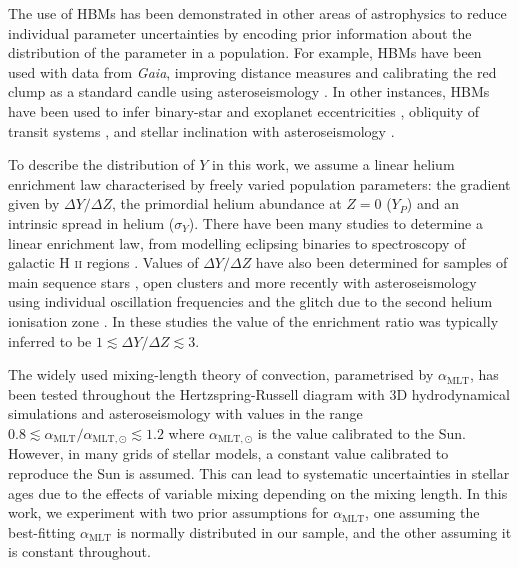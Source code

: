 \documentclass[a4paper,fleqn,usenatbib]{mnras}
\newcommand{\mlt}{\ensuremath{{\alpha_\mathrm{MLT}}}}
\begin{document}
The use of HBMs has been demonstrated in other areas of astrophysics to reduce individual parameter uncertainties by encoding prior information about the distribution of the parameter in a population. For example, HBMs have been used with data from \emph{Gaia}, improving distance measures \citep{Leistedt.Hogg2017, Anderson.Hogg.ea2018} and calibrating the red clump as a standard candle \citep{Hawkins.Leistedt.ea2017, Chan.Bovy2020} using asteroseismology \citep{Hall.Davies.ea2019}. In other instances, HBMs have been used to infer binary-star and exoplanet eccentricities \citep{Hogg.Myers.ea2010}, obliquity of transit systems \citep{Morton.Winn2014}, and stellar inclination with asteroseismology \citep{Campante.Lund.ea2016, Kuszlewicz.Chaplin.ea2019}.

To describe the distribution of $Y$ in this work, we assume a linear helium enrichment law characterised by freely varied population parameters: the gradient given by $\Delta Y / \Delta Z$, the primordial helium abundance at $Z=0$ ($Y_P$) and an intrinsic spread in helium ($\sigma_Y$). There have been many studies to determine a linear enrichment law, from modelling eclipsing binaries \citep{Ribas.Jordi.ea2000} to spectroscopy of galactic H \textsc{ii} regions \citep{Balser2006}. Values of $\Delta Y / \Delta Z$ have also been determined for samples of main sequence stars \citep{Casagrande.Flynn.ea2007}, open clusters \citep{Brogaard.VandenBerg.ea2012} and more recently with asteroseismology using individual oscillation frequencies \citep{SilvaAguirre.Lund.ea2017} and the glitch due to the second helium ionisation zone \citep{Verma.Raodeo.ea2019}. In these studies the value of the enrichment ratio was typically inferred to be $1 \lesssim \Delta Y / \Delta Z \lesssim 3$.

The widely used mixing-length theory of convection, parametrised by $\mlt$, has been tested throughout the Hertzspring-Russell diagram with 3D hydrodynamical simulations \citep{Trampedach.Stein.ea2014, Magic.Weiss.ea2015} and asteroseismology \citep{Tayar.Somers.ea2017, Viani.Basu.ea2018, Li.Bedding.ea2018} with values in the range $0.8 \lesssim \mlt/\alpha_{\mathrm{MLT}, \odot} \lesssim 1.2$ where $\alpha_{\mathrm{MLT}, \odot}$ is the value calibrated to the Sun. However, in many grids of stellar models, a constant value calibrated to reproduce the Sun is assumed. This can lead to systematic uncertainties in stellar ages due to the effects of variable mixing depending on the mixing length. In this work, we experiment with two prior assumptions for $\mlt$, one assuming the best-fitting $\mlt$ is normally distributed in our sample, and the other assuming it is constant throughout.
\end{document}
